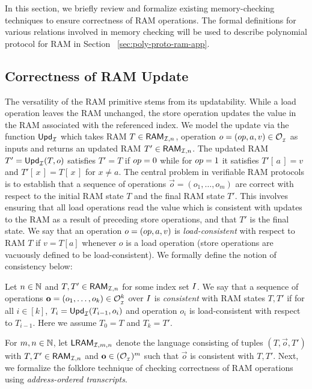 In this section, we briefly review and formalize existing memory-checking techniques to ensure
correctness of RAM operations. The formal definitions for various relations involved in memory checking
will be used to describe polynomial protocol for RAM in Section ~\ref{sec:poly-proto-ram-app}.

\subsection{Correctness of RAM Update}\label{subsec:ram-update}
The versatility of the RAM primitive stems from its updatability. While a load operation leaves the RAM unchanged, the store operation
updates the value in the RAM associated with the referenced index. We model the update via the function
$\mathsf{Upd}_{\mathcal{I}}$ which takes RAM $T\in \mathsf{RAM}_{\mathcal{I}, {n}}$, operation
$o=({op},a,v)\in \mathcal{O}_{{}_\mathcal{I}}$ as inputs and returns an updated RAM $T'\in \mathsf{RAM}_{\mathcal{I}, {n}}$.
The updated RAM $T'=\mathsf{Upd}_{\mathcal{I}}(T,o)$ satisfies
$T'=T$ if ${op}=0$ while for ${op}=1$ it satisfies $T'[\,a\,]=v$  and $T'[\,x\,]=T[\,x\,]$ for $x\neq a$. The central problem
in verifiable RAM protocols is to establish that a sequence of operations $\vec{o}=(o_1,\ldots,o_m)$ are correct with
respect to the initial RAM state $T$ and the final RAM state $T'$. This involves ensuring
that all load operations read the value which is consistent with updates to the RAM as a result of preceding
store operations, and that $T'$ is the final state. We say that an operation $o=({op},a,v)$ is {\em load-consistent}
with respect to RAM $T$ if $v=T[a]$ whenever $o$ is a load operation (store operations are vacuously defined to be load-consistent).
We formally define the notion of consistency below:

\begin{definition}\label{defn:consistent-operations}
    Let $n\in \mathbb{N}$ and $T,T'\in \mathsf{RAM}_{\mathcal{I}, {n}}$ for some index set $I$. We say that a sequence of operations
    $\mathbf{o}=(o_1,\ldots,o_k)\in \mathcal{O}_{{}_\mathcal{I}}^k$ over $I$ is {\em consistent} with RAM states
    $T,T'$ if for all $i\in [k]$, $T_{i}=\mathsf{Upd}_{\mathcal{I}}(T_{i-1},o_i)$ and operation $o_i$ is load-consistent with respect to $T_{i-1}$. Here
    we assume $T_0=T$ and $T_k=T'$.
\end{definition}

For $m,n\in \mathbb{N}$, let $\mathsf{LRAM}_{\mathcal{I},m,n}$ denote the language consisting of tuples $(T,\vec{o},T')$ with $T,T'\in \mathsf{RAM}_{\mathcal{I}, {n}}$ and $\mathbf{o}\in (\mathcal{O}_{{}_\mathcal{I}})^m$
such that $\vec{o}$ is consistent with $T,T'$.
Next, we formalize the folklore technique of checking correctness of RAM operations
using {\em address-ordered transcripts}.

